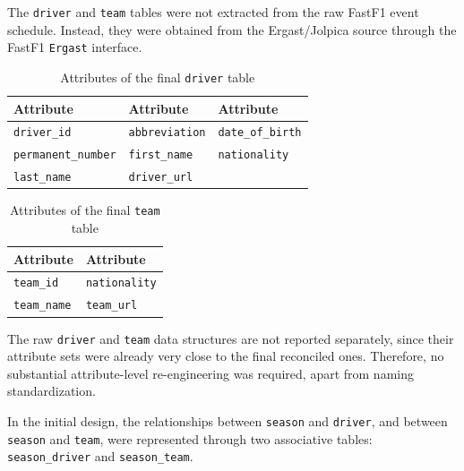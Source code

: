 \documentclass[12pt,a4paper]{article}
\begin{document}
	The \texttt{driver} and \texttt{team} tables were not extracted from the raw FastF1 event schedule.
	Instead, they were obtained from the Ergast/Jolpica source through the FastF1 \texttt{Ergast} interface.

	
	\begin{table}[H]
		\centering
		\caption{Attributes of the final \texttt{driver} table}
		\renewcommand{\arraystretch}{1.15}
		\begin{tabularx}{0.95\textwidth}{>{\raggedright\arraybackslash}X >{\raggedright\arraybackslash}X >{\raggedright\arraybackslash}X}
			\toprule
			\textbf{Attribute} & \textbf{Attribute} & \textbf{Attribute} \\
			\midrule
			\texttt{driver\_id}         & \texttt{abbreviation}    & \texttt{date\_of\_birth} \\
			\texttt{permanent\_number}  & \texttt{first\_name}     & \texttt{nationality} \\
			\texttt{last\_name}         & \texttt{driver\_url}     & \\
			\bottomrule
		\end{tabularx}
	\end{table}
	
	\begin{table}[H]
		\centering
		\caption{Attributes of the final \texttt{team} table}
		\renewcommand{\arraystretch}{1.15}
		\begin{tabularx}{0.75\textwidth}{>{\raggedright\arraybackslash}X >{\raggedright\arraybackslash}X}
			\toprule
			\textbf{Attribute} & \textbf{Attribute} \\
			\midrule
			\texttt{team\_id}      & \texttt{nationality} \\
			\texttt{team\_name}    & \texttt{team\_url} \\
			\bottomrule
		\end{tabularx}
	\end{table}
		
	The raw \texttt{driver} and \texttt{team} data structures are not reported separately, since their attribute sets were already very close to the final reconciled ones. Therefore, no substantial attribute-level re-engineering was required, apart from naming standardization.
	

	
	In the initial design, the relationships between \texttt{season} and \texttt{driver}, and between
	\texttt{season} and \texttt{team}, were represented through two associative tables:
	\texttt{season\_driver} and \texttt{season\_team}.
	
\end{document}
